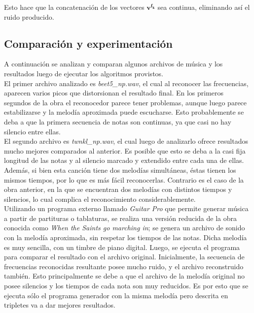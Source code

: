 \documentclass[journal, monochrome]{IEEEtran}
\begin{document}
Esto hace que la concatenación de los vectores $\mathbf{v^{f_k}}$ sea continua, eliminando así el ruido producido.


\subsection{Comparación y experimentación}

A continuación se analizan y comparan algunos archivos de música y los resultados luego de ejecutar los algoritmos provistos.  \\

El primer archivo analizado es \emph{beet5\_np.wav}, el cual al reconocer las frecuencias, aparecen varios picos que distorsionan el resultado final. En los primeros segundos de la obra el reconocedor parece tener problemas, aunque luego parece estabilizarse y la melodía aproximada puede escucharse. Esto probablemente se deba a que la primera secuencia de notas son continuas, ya que casi no hay silencio entre ellas.  \\

El segundo archivo es \emph{twnkl\_np.wav}, el cual luego de analizarlo ofrece resultados mucho mejores comparados al anterior. Es posible que esto se deba a la casi fija longitud de las notas y al silencio marcado y extendido entre cada una de ellas. Además, si bien esta canción tiene dos melodías simultáneas, éstas tienen los mismos tiempos, por lo que es más fácil reconocerlas. Contrario es el caso de la obra anterior, en la que se encuentran dos melodías con distintos tiempos y silencios, lo cual complica el reconocimiento considerablemente. \\ 

Utilizando un programa externo llamado \emph{Guitar Pro} que permite generar música a partir de partituras o tablaturas, se realiza una versión reducida de la obra conocida como \emph{When the Saints go marching in}; se genera un archivo de sonido con la melodía aproximada, sin respetar los tiempos de las notas. Dicha melodía es muy sencilla, con un timbre de piano digital. Luego, se ejecuta el programa para comparar el resultado con el archivo original. Inicialmente, la secuencia de frecuencias reconocidas resultante posee mucho ruido, y el archivo reconstruido también. Esto principalmente se debe a que el archivo de la melodía original no posee silencios y los tiempos de cada nota son muy reducidos. Es por esto que se ejecuta sólo el programa generador con la misma melodía pero descrita en tripletes va a dar mejores resultados.
\end{document}
